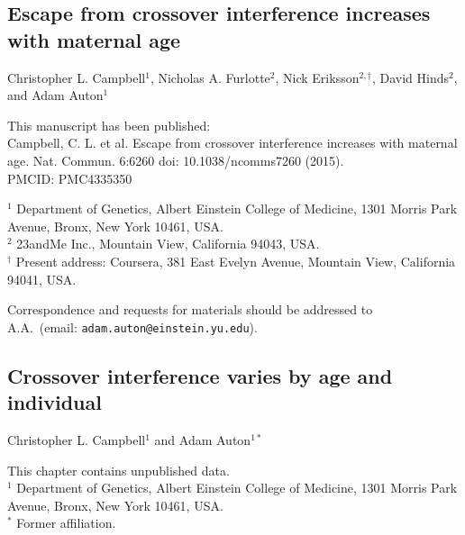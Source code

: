 \documentclass[11pt,twoside,openright,letterpaper]{memoir}
\begin{document}
\begin{SingleSpace}
\chapter[Interference escape increases with maternal age]{Escape from crossover interference increases with maternal age} \label{ch:cointEsc}

\noindent Christopher L. Campbell$^1$, Nicholas A. Furlotte$^2$, Nick Eriksson$^{2,\dagger}$, David Hinds$^2$, and Adam Auton$^1$

\vspace{0.5cm}
\noindent This manuscript has been published: \\
Campbell, C. L. et al. Escape from crossover interference increases with maternal age. Nat. Commun. 6:6260 doi: 10.1038/ncomms7260 (2015). \\
PMCID: PMC4335350

\vspace{0.5cm}
\noindent $^1$ Department of Genetics, Albert Einstein College of Medicine, 1301 Morris Park Avenue, Bronx, New York 10461, USA. \\
\noindent $^2$ 23andMe Inc., Mountain View, California 94043, USA. \\
\noindent $^\dagger$ Present address: Coursera, 381 East Evelyn Avenue, Mountain View, California 94041, USA. \\

\vspace{0.5cm}
\begin{centering}
    Correspondence and requests for materials should be addressed to \\
    A.A.\ (email: \texttt{adam.auton@einstein.yu.edu}). \\
\end{centering}
\end{SingleSpace}




\begin{SingleSpace}
\chapter{Crossover interference varies by age and individual} \label{ch:cointExtras}

\noindent Christopher L. Campbell$^1$ and Adam Auton$^{1*}$

\vspace{0.5cm}
\noindent This chapter contains unpublished data.\\

\vspace{0.5cm}
\noindent $^1$ Department of Genetics, Albert Einstein College of Medicine, 1301 Morris Park Avenue, Bronx, New York 10461, USA. \\
\noindent $^*$ Former affiliation.
\end{SingleSpace}
\end{document}
